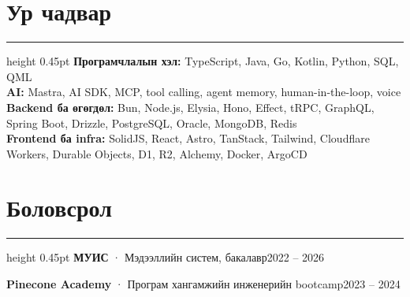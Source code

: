 \documentclass[9.5pt,letterpaper]{article}
\newcommand{\cvsection}[1]{\section*{#1}\vspace{3pt}\hrule height 0.45pt\vspace{3pt}}
\newcommand{\dated}[2]{#1\hfill#2\par}
\begin{document}
\cvsection{Ур чадвар}
\textbf{Програмчлалын хэл:} TypeScript, Java, Go, Kotlin, Python, SQL, QML\\
\textbf{AI:} Mastra, AI SDK, MCP, tool calling, agent memory, human-in-the-loop, voice\\
\textbf{Backend ба өгөгдөл:} Bun, Node.js, Elysia, Hono, Effect, tRPC, GraphQL, Spring Boot, Drizzle, PostgreSQL, Oracle, MongoDB, Redis\\
\textbf{Frontend ба infra:} SolidJS, React, Astro, TanStack, Tailwind, Cloudflare Workers, Durable Objects, D1, R2, Alchemy, Docker, ArgoCD

\cvsection{Боловсрол}
\dated{\textbf{МУИС} · Мэдээллийн систем, бакалавр}{2022 – 2026}
\dated{\textbf{Pinecone Academy} · Програм хангамжийн инженерийн bootcamp}{2023 – 2024}
\end{document}
